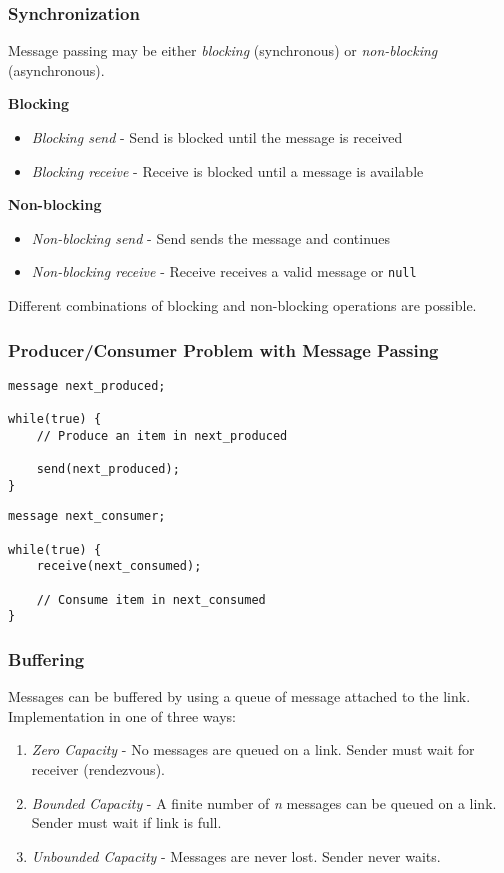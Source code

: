 \documentclass[]{article}
\begin{document}
\subsubsection*{Synchronization}

Message passing may be either \emph{blocking} (synchronous) or \emph{non-blocking} (asynchronous).

\textbf{Blocking}
\begin{itemize}
    \item \emph{Blocking send} - Send is blocked until the message is received
    \item \emph{Blocking receive} - Receive is blocked until a message is available
\end{itemize}

\textbf{Non-blocking}
\begin{itemize}
    \item \emph{Non-blocking send} - Send sends the message and continues
    \item \emph{Non-blocking receive} - Receive receives a valid message or \verb|null|
\end{itemize}

Different combinations of blocking and non-blocking operations are possible.

\subsubsection*{Producer/Consumer Problem with Message Passing}

\begin{tcolorbox}[title = Producer]
\begin{verbatim}
message next_produced;

while(true) {
    // Produce an item in next_produced

    send(next_produced);
}
\end{verbatim}
\end{tcolorbox}

\begin{tcolorbox}[title = Consumer]
\begin{verbatim}
message next_consumer;

while(true) {
    receive(next_consumed);

    // Consume item in next_consumed
}
\end{verbatim}
\end{tcolorbox}

\subsubsection*{Buffering}
Messages can be buffered by using a queue of message attached to the link. Implementation in one of three ways:
\begin{enumerate}
    \item \emph{Zero Capacity} - No messages are queued on a link. Sender must wait for receiver (rendezvous).
    \item \emph{Bounded Capacity} - A finite number of \emph{n} messages can be queued on a link. Sender must wait if link is full.
    \item \emph{Unbounded Capacity} - Messages are never lost. Sender never waits.
\end{enumerate}
\end{document}
